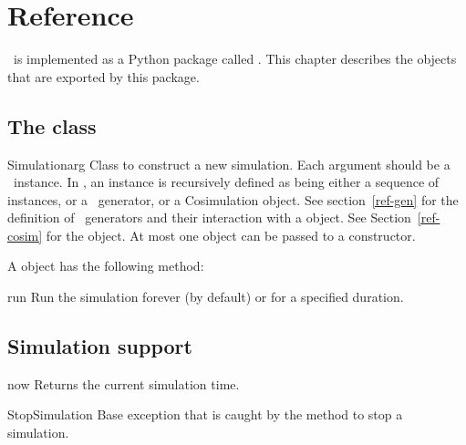 \chapter{Reference \label{ref}}


\myhdl\ is implemented as a Python package called . This
chapter describes the objects that are exported by this package.

\section{The  class \label{ref-sim}}

\begin{classdesc}{Simulation}{arg }
Class to construct a new simulation. Each argument should be a
\myhdl\ instance. In \myhdl{}, an instance is recursively defined
as being either a sequence of instances, or a \myhdl\ generator, or a
Cosimulation object. See section~\ref{ref-gen} for the definition of
\myhdl\ generators and their interaction with a
 object.  See Section~\ref{ref-cosim}
for the  object.  At most one 
object can be passed to a  constructor.

\end{classdesc}

A  object has the following method:

\begin{methoddesc}[Simulation]{run}{}
Run the simulation forever (by default) or for a specified duration.
\end{methoddesc}


\section{Simulation support\label{ref-simsupport}}

\begin{funcdesc}{now}{}
Returns the current simulation time.
\end{funcdesc}

\begin{excclassdesc}{StopSimulation}{}
Base exception that is caught by the  method to
stop a simulation.
\end{excclassdesc}

